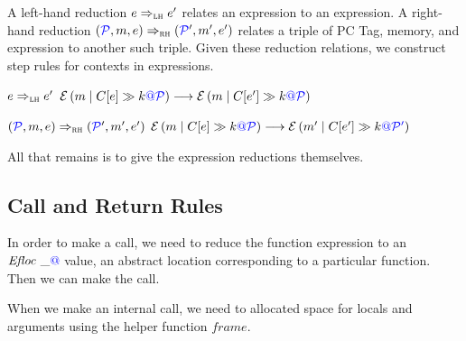 \documentclass{llncs}
\begin{document}
\begin{table}[t]
A left-hand reduction \(e \Rightarrow_{\textnormal{\sc lh}} e'\)
relates an expression to an expression. A right-hand reduction
\((\mathcal{\color{blue} P\mathit{}},m,e) \Rightarrow_{\textnormal{\sc rh}} (\mathcal{\color{blue} P\mathit{}}',m',e')\)
relates a triple of PC Tag, memory, and expression to another such triple.
Given these reduction relations, we construct step rules for contexts in
expressions.


\judgmenttwo{\(\ctx{\expr}_\lh\)}
            {\(e \Rightarrow_{\textnormal{\sc lh}} e'\)}
            {\(\mathcal{E}\left(m \mid C \!\left[e\right] \gg k {\color{blue} {\color{blue} @} \mathcal{\color{blue} P\mathit{}}}\right) \longrightarrow \mathcal{E}\left(m \mid C \!\left[e'\right] \gg k {\color{blue} {\color{blue} @} \mathcal{\color{blue} P\mathit{}}}\right)\)}

\judgmenttwo{\(\ctx{\expr}_\rh\)}
            {\((\mathcal{\color{blue} P\mathit{}}, m, e) \Rightarrow_{\textnormal{\sc rh}} (\mathcal{\color{blue} P\mathit{}}', m', e')\)}
            {\(\mathcal{E}\left(m \mid C \!\left[e\right] \gg k {\color{blue} {\color{blue} @} \mathcal{\color{blue} P\mathit{}}}\right) \longrightarrow \mathcal{E}\left(m' \mid C \!\left[e'\right] \gg k {\color{blue} {\color{blue} @} \mathcal{\color{blue} P\mathit{}}'}\right)\)}
            
All that remains is to give the expression reductions themselves.

\expressions

\subsection{Call and Return Rules}

In order to make a call, we need to reduce the function expression to an \(\mathit{Efloc} ~ \_{\color{blue} @}\) value, an
abstract location corresponding to a particular function. Then we can make the call.

\callexprstep

When we make an internal call, we need to allocated space for locals and arguments using the helper function
\(\mathit{frame}\).


\end{table}
\end{document}
